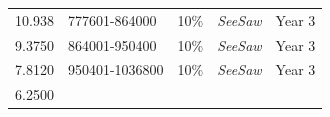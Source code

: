 \documentclass[11pt,a4paperpaper,]{report}
\begin{document}
\begin{longtable}[]{@{}llllc@{}}
\begin{minipage}[t]{0.12\columnwidth}
10.938\strut
\end{minipage} & \begin{minipage}[t]{0.19\columnwidth}\raggedright\strut
777601-864000\strut
\end{minipage} & \begin{minipage}[t]{0.14\columnwidth}\raggedright\strut
10\%\strut
\end{minipage} & \begin{minipage}[t]{0.25\columnwidth}\raggedright\strut
\textit{SeeSaw}\strut
\end{minipage} & \begin{minipage}[t]{0.12\columnwidth}\centering\strut
Year 3\strut
\end{minipage}\tabularnewline
\begin{minipage}[t]{0.12\columnwidth}\raggedright\strut
9.3750\strut
\end{minipage} & \begin{minipage}[t]{0.19\columnwidth}\raggedright\strut
864001-950400\strut
\end{minipage} & \begin{minipage}[t]{0.14\columnwidth}\raggedright\strut
10\%\strut
\end{minipage} & \begin{minipage}[t]{0.25\columnwidth}\raggedright\strut
\textit{SeeSaw}\strut
\end{minipage} & \begin{minipage}[t]{0.12\columnwidth}\centering\strut
Year 3\strut
\end{minipage}\tabularnewline
\begin{minipage}[t]{0.12\columnwidth}\raggedright\strut
7.8120\strut
\end{minipage} & \begin{minipage}[t]{0.19\columnwidth}\raggedright\strut
950401-1036800\strut
\end{minipage} & \begin{minipage}[t]{0.14\columnwidth}\raggedright\strut
10\%\strut
\end{minipage} & \begin{minipage}[t]{0.25\columnwidth}\raggedright\strut
\textit{SeeSaw}\strut
\end{minipage} & \begin{minipage}[t]{0.12\columnwidth}\centering\strut
Year 3\strut
\end{minipage}\tabularnewline
\begin{minipage}[t]{0.12\columnwidth}\raggedright\strut
6.2500\strut
\end{minipage} & \begin{minipage}[t]{0.19\columnwidth}\raggedright\strut

\end{minipage}
\end{longtable}
\end{document}

